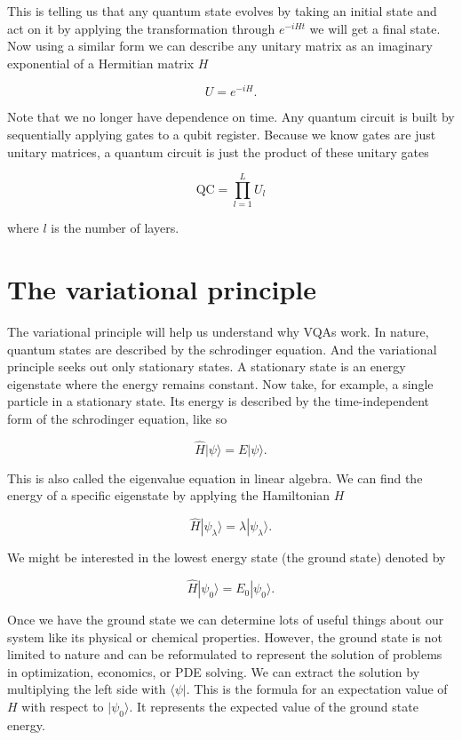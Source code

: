 \documentclass[12pt, oneside]{book}
\begin{document}
This is telling us that any quantum state evolves by taking an initial state and act on it by applying the transformation 
through $e^{-i H t}$ we will get a final state. Now using a similar form we can describe any unitary matrix as an 
imaginary exponential of a Hermitian matrix $H$ 

$$
U = e^{-i H}.
$$

Note that we no longer have dependence on time. Any quantum circuit is built by sequentially applying gates to a qubit
register. Because we know gates are just unitary matrices, a quantum circuit is just the product of these unitary gates 

$$
\text{QC} = \prod_{l=1}^{L} U_l
$$

where $l$ is the number of layers. 

\section{The variational principle}
The variational principle will help us understand why VQAs work. In nature, quantum states are described by the schrodinger 
equation. And the variational principle seeks out only stationary states. A stationary state is an energy eigenstate where 
the energy remains constant. Now take, for example, a single particle in a stationary state. 
Its energy is described by the time-independent form of the schrodinger equation, like so 

$$
\hat{H}|\psi\rangle=E|\psi\rangle.
$$

This is also called the eigenvalue equation in linear algebra. We can find the energy of a specific eigenstate 
by applying the Hamiltonian $H$

$$
\hat{H}|\psi_{\lambda}\rangle=\lambda|\psi_{\lambda}\rangle.
$$

 We might be 
interested in the lowest energy state (the ground state) denoted by 

$$
\hat{H}|\psi_0\rangle = E_0|\psi_0 \rangle.
$$

Once we have the ground state we can determine lots of useful things about our system like its physical or chemical properties.
However, the ground state is not limited to nature and can be reformulated to represent the solution of problems in 
optimization, economics, or PDE solving. We can extract the solution by multiplying the left side with $\langle \psi |$. 
This is the formula for an expectation value of $H$ with respect to $|\psi_0\rangle$. It represents the 
expected value of the ground state energy.   
\end{document}
